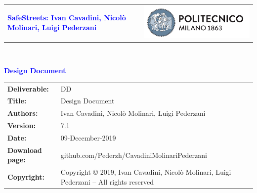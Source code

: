 




\begin{titlepage}



{\begin{table}[t!]
\centering
\begin{tabu} to \textwidth { X[1.3,r,p] X[1.7,l,p] }
\textcolor{Blue}
{\textbf{\small{SafeStreets: Ivan Cavadini, Nicolò Molinari, Luigi Pederzani}}} & \includegraphics[scale=0.5]{Images/PolimiLogo}
\end{tabu}
\end{table}}~\\ [7cm]


\begin{flushleft}

{\textcolor{Blue}{\textbf{\Huge{Design Document}}}} \\ [1cm]

\end{flushleft}

\end{titlepage}

\begin{table}[h!]
\begin{tabu} to \textwidth { X[0.3,r,p] X[0.7,l,p] }
\hline

\textbf{Deliverable:} & DD\\
\textbf{Title:} & Design Document \\
\textbf{Authors:} & Ivan Cavadini, Nicolò Molinari, Luigi Pederzani \\
\textbf{Version:} & 7.1 \\ 
\textbf{Date:} & 09-December-2019 \\
\textbf{Download page:} & github.com/Pederzh/CavadiniMolinariPederzani \\
\textbf{Copyright:} & Copyright © 2019, Ivan Cavadini, Nicolò Molinari, Luigi Pederzani – All rights reserved \\
\hline
\end{tabu}
\end{table}




